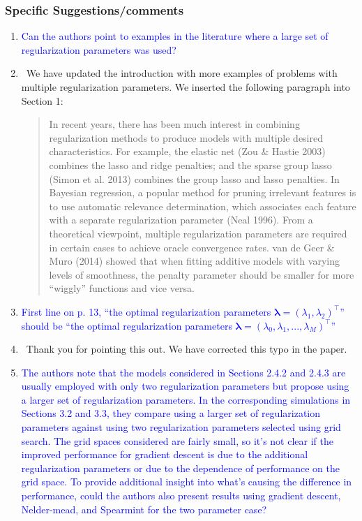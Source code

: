 \documentclass[]{article}
\newcommand{\point}[1]{\item \textcolor{blue}{#1}}
\newcommand{\reply}{\item[]\ }
\begin{document}
	\subsubsection*{Specific Suggestions/comments}
	
	\begin{enumerate}
		\point{Can the authors point to examples in the literature where a large set of regularization parameters was used?}
		
		\reply We have updated the introduction with more examples of problems with multiple regularization parameters. We inserted the following paragraph into Section 1:
		
		\begin{quote}
			In recent years, there has been much interest in combining regularization methods to produce models with multiple desired characteristics. For example, the elastic net (Zou \& Hastie 2003) combines the lasso and ridge penalties; and the sparse group lasso (Simon et al. 2013) combines the group lasso and lasso penalties. In Bayesian regression, a popular method for pruning irrelevant features is to use automatic relevance determination, which associates each feature with a separate regularization parameter (Neal 1996). From a theoretical viewpoint, multiple regularization parameters are required in certain cases to achieve oracle convergence rates. van de Geer \& Muro (2014) showed that when fitting additive models with varying levels of smoothness, the penalty parameter should be smaller for more ``wiggly'' functions and vice versa. 
		\end{quote}
		
		\point{First line on p. 13, ``the optimal regularization parameters $\boldsymbol{\lambda} = (\lambda_1,\lambda_2)^\top$'' should be ``the optimal regularization parameters $\boldsymbol{\lambda} = (\lambda_0, \lambda_1, ... , \lambda_M)^\top$''}
		
		\reply Thank you for pointing this out. We have corrected this typo in the paper.
		
		\point{The authors note that the models considered in Sections 2.4.2 and 2.4.3 are usually employed with only two regularization parameters but propose using a larger set of regularization parameters. In the corresponding simulations in Sections 3.2 and 3.3, they compare using a larger set of regularization parameters against using two regularization parameters selected using grid search. The grid spaces considered are fairly small, so it’s not clear if the improved performance for gradient descent is due to the additional regularization parameters or due to the dependence of performance on the grid space. To provide additional insight into what’s causing the difference in performance, could the authors also present results using gradient descent, Nelder-mead, and Spearmint for the two parameter case?}
		

\end{enumerate}
\end{document}
